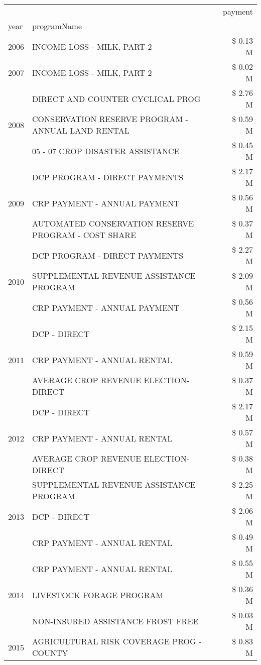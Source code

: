 \begin{tabular}{llr}
\toprule
 &  & payment \\
year & programName &  \\
\midrule
2006 & INCOME LOSS - MILK, PART 2 & \$ 0.13 M \\
\cline{1-3}
2007 & INCOME LOSS - MILK, PART 2 & \$ 0.02 M \\
\cline{1-3}
\multirow[t]{3}{*}{2008} & DIRECT AND COUNTER CYCLICAL PROG & \$ 2.76 M \\
 & CONSERVATION RESERVE PROGRAM - ANNUAL LAND RENTAL & \$ 0.59 M \\
 & 05 - 07 CROP DISASTER ASSISTANCE & \$ 0.45 M \\
\cline{1-3}
\multirow[t]{3}{*}{2009} & DCP PROGRAM - DIRECT PAYMENTS & \$ 2.17 M \\
 & CRP PAYMENT - ANNUAL PAYMENT & \$ 0.56 M \\
 & AUTOMATED CONSERVATION RESERVE PROGRAM - COST SHARE & \$ 0.37 M \\
\cline{1-3}
\multirow[t]{3}{*}{2010} & DCP PROGRAM - DIRECT PAYMENTS & \$ 2.27 M \\
 & SUPPLEMENTAL REVENUE ASSISTANCE PROGRAM & \$ 2.09 M \\
 & CRP PAYMENT - ANNUAL PAYMENT & \$ 0.56 M \\
\cline{1-3}
\multirow[t]{3}{*}{2011} & DCP - DIRECT & \$ 2.15 M \\
 & CRP PAYMENT - ANNUAL RENTAL & \$ 0.59 M \\
 & AVERAGE CROP REVENUE ELECTION-DIRECT & \$ 0.37 M \\
\cline{1-3}
\multirow[t]{3}{*}{2012} & DCP - DIRECT & \$ 2.17 M \\
 & CRP PAYMENT - ANNUAL RENTAL & \$ 0.57 M \\
 & AVERAGE CROP REVENUE ELECTION-DIRECT & \$ 0.38 M \\
\cline{1-3}
\multirow[t]{3}{*}{2013} & SUPPLEMENTAL REVENUE ASSISTANCE PROGRAM & \$ 2.25 M \\
 & DCP - DIRECT & \$ 2.06 M \\
 & CRP PAYMENT - ANNUAL RENTAL & \$ 0.49 M \\
\cline{1-3}
\multirow[t]{3}{*}{2014} & CRP PAYMENT - ANNUAL RENTAL & \$ 0.55 M \\
 & LIVESTOCK FORAGE PROGRAM & \$ 0.36 M \\
 & NON-INSURED ASSISTANCE FROST FREE & \$ 0.03 M \\
\cline{1-3}
\multirow[t]{3}{*}{2015} & AGRICULTURAL RISK COVERAGE PROG - COUNTY & \$ 0.83 M \\

\end{tabular}
